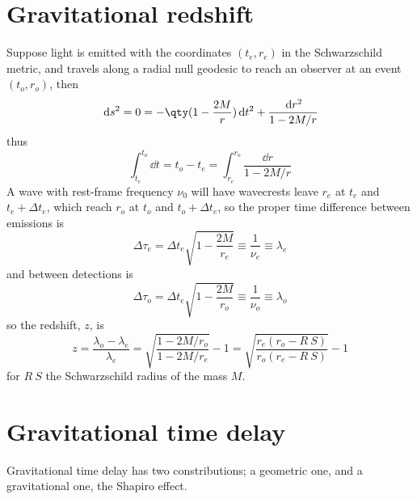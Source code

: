 \section{Gravitational redshift}
\label{sec:grav-redsh-1}

Suppose light is emitted with the coordinates $(t_e,r_e)$ in the
Schwarzschild metric, and travels along a radial null geodesic to
reach an observer at an event $(t_o, r_o)$, then
\begin{equation}
  \label{eq:185}
  \dd{s}^2 = 0 = - \qty( 1 - \frac{2M}{r} ) \dd{t}^2 + \frac{\dd{r}^2}{1 - 2M/r}
\end{equation}
thus
\begin{equation}
  \label{eq:186}
  \int_{t_e}^{t_o} \dd{t} = t_o - t_e = \int_{r_e}^{r_o} \frac{\dd{r}}{1 - 2M/r}
\end{equation}
A wave with rest-frame frequency $\nu_0$ will have wavecrests leave
$r_e$ at $t_e$ and $t_e + \Delta t_e$, which reach $r_o$ at $t_o$ and
$t_o+\Delta t_e$, so the proper time difference between emissions is
\begin{equation}
  \label{eq:187}
  \Delta \tau_e = \Delta t_e \sqrt{1 - \frac{2M}{r_e}} \equiv \frac{1}{\nu_e} \equiv {\lambda_e}
\end{equation}
and between detections is
\begin{equation}
  \label{eq:188}
  \Delta \tau_o = \Delta t_e \sqrt{1 - \frac{2M}{r_o}} \equiv \frac{1}{\nu_o} \equiv \lambda_o
\end{equation}
so the redshift, $z$, is
\begin{equation}
  \label{eq:189}
  z = \frac{\lambda_o - \lambda_e}{\lambda_e} = \sqrt{ \frac{1-2M/r_o}{1-2M/r_e}} - 1 = \sqrt{\frac{r_e(r_o-R~S)}{r_o(r_e-R~S)}}-1
\end{equation}
for $R~S$ the Schwarzschild radius of the mass $M$.

\section{Gravitational time delay}
\label{sec:grav-time-delay}

Gravitational time delay has two constributions; a geometric one, and
a gravitational one, the Shapiro effect.

